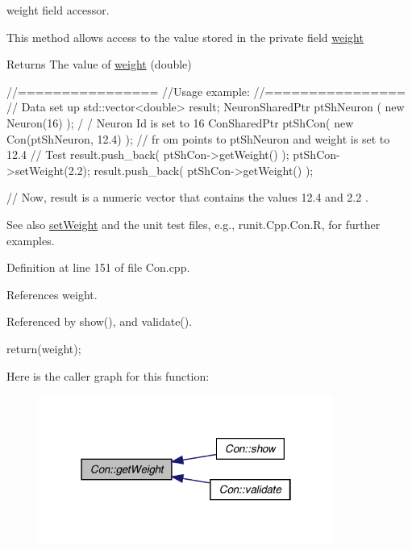 weight field accessor. 

This method allows access to the value stored in the private field \hyperlink{class_con_a7f46485ba5b41971ea38641f9e7d1be0}{weight} \begin{DoxyReturn}{Returns}
The value of \hyperlink{class_con_a7f46485ba5b41971ea38641f9e7d1be0}{weight} (double)
\end{DoxyReturn}

\begin{DoxyCode}
  //================
  //Usage example:
  //================
  // Data set up
                        std::vector<double> result;
                        NeuronSharedPtr ptShNeuron ( new Neuron(16) );          /
      / Neuron Id is set to 16
                        ConSharedPtr ptShCon( new Con(ptShNeuron, 12.4) );  // fr
      om points to ptShNeuron and weight is set to 12.4
        // Test
                        result.push_back( ptShCon->getWeight() );
                        ptShCon->setWeight(2.2);
                        result.push_back( ptShCon->getWeight() );

        // Now, result is a numeric vector that contains the values 12.4 and 2.2 
      .
\end{DoxyCode}


\begin{DoxySeeAlso}{See also}
\hyperlink{class_con_aa9b30bb7eda5c5578d11a65977968d38}{setWeight} and the unit test files, e.g., runit.Cpp.Con.R, for further examples. 
\end{DoxySeeAlso}


Definition at line 151 of file Con.cpp.



References weight.



Referenced by show(), and validate().


\begin{DoxyCode}
                       {
        return(weight);
}
\end{DoxyCode}


Here is the caller graph for this function:\nopagebreak
\begin{figure}[H]
\begin{center}
\leavevmode
\includegraphics[width=274pt]{class_con_a385c5bf6eb9e2ffc94c5b427c287ccb2_icgraph}
\end{center}
\end{figure}


